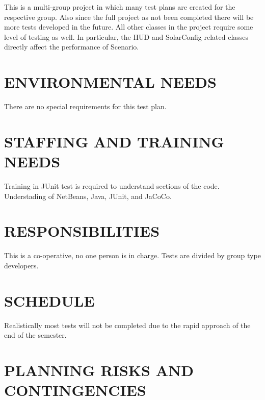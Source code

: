 {{{{\color{black}
This is a multi-group project in which many test plans are created for the respective group. Also since the full project as not been completed there will be more tests developed in the future. 
\newline
\newline
All other classes in the project require some level of testing as well. 
In particular, the HUD and SolarConfig related classes directly affect 
the performance of Scenario.
}

\section[ENVIRONMENTAL NEEDS]{\bfseries\color{black} ENVIRONMENTAL NEEDS}

{\color{black}
There are no special requirements for this test plan. 
}

\section[STAFFING AND TRAINING NEEDS]{\bfseries\color{black} STAFFING AND TRAINING NEEDS}
{\color{black}

{\color{black}
Training in JUnit test is required to understand sections of the code. 
\newline
\newline
Understading of NetBeans, Java, JUnit, and JaCoCo.
}

\section[RESPONSIBILITIES]{\bfseries\color{black} RESPONSIBILITIES}
{\color{black}

{\color{black}
This is a co-operative, no one person is in charge. Tests are divided by group type developers. 
}

\section[SCHEDULE]{\bfseries\color{black} SCHEDULE}
{\color{black}


{\color{black}
Realistically most tests will not be completed due to the rapid approach of the end of the semester.  
}

\section[PLANNING RISKS AND CONTINGENCIES]{\bfseries\color{black} PLANNING RISKS AND CONTINGENCIES}

}}}}}}

